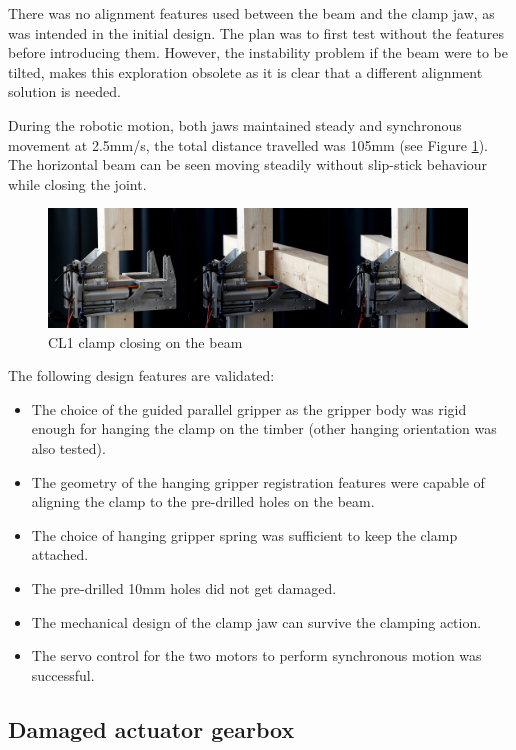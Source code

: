 There was no alignment features used between the beam and the clamp jaw, as was intended in the initial design. The plan was to first test without the features before introducing them. However, the instability problem if the beam were to be tilted, makes this exploration obsolete as it is clear that a different alignment solution is needed.

During the robotic motion, both jaws maintained steady and synchronous movement at 2.5mm/s, the total distance travelled was 105mm (see Figure \ref{fig:cl1-clamp-closing-photo}). The horizontal beam can be seen moving steadily without slip-stick behaviour while closing the joint.  

\begin{figure}
    \centering
    \includegraphics[width=0.99\textwidth]{images/04-4+5/cl1-test-threesteps.jpg}
    \caption{CL1 clamp closing on the beam}
    \label{fig:cl1-clamp-closing-photo}
\end{figure}

The following design features are validated:
\begin{itemize}
    \item The choice of the guided parallel gripper as the gripper body was rigid enough for hanging the clamp on the timber (other hanging orientation was also tested).
    \item The geometry of the hanging gripper registration features were capable of aligning the clamp to the pre-drilled holes on the beam.
    \item The choice of hanging gripper spring was sufficient to keep the clamp attached.
    \item The pre-drilled 10mm holes did not get damaged.
    \item The mechanical design of the clamp jaw can survive the clamping action.
    \item The servo control for the two motors to perform synchronous motion was successful.
\end{itemize}

\subsection{Damaged actuator gearbox}
\label{subsection:exploration-1-damaged-actuator-gearbox}

